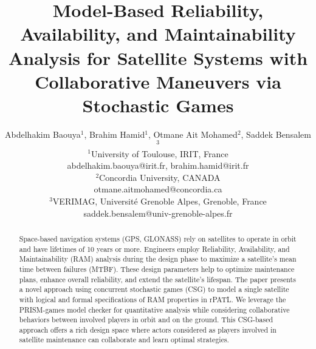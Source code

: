 \documentclass[conference]{IEEEtran}
\begin{document}



\title{Model-Based Reliability, Availability, and Maintainability Analysis for Satellite Systems with Collaborative Maneuvers via Stochastic Games}




\author{Abdelhakim Baouya$^{1}$, Brahim Hamid$^{1}$, Otmane Ait Mohamed$^{2}$, Saddek Bensalem$^{3}$\\
	\normalsize $^{1}$University of Toulouse, IRIT, France\\
	\normalsize abdelhakim.baouya@irit.fr, brahim.hamid@irit.fr\\
 	\normalsize $^{2}$Concordia University, CANADA\\
	\normalsize otmane.aitmohamed@concordia.ca\\
  	\normalsize $^{3}$VERIMAG, Université Grenoble Alpes, Grenoble, France\\
	\normalsize saddek.bensalem@univ-grenoble-alpes.fr\\
}



\maketitle

\begin{abstract}
Space-based navigation systems (GPS, GLONASS) rely on satellites to operate in orbit and have lifetimes of 10 years or more. Engineers employ Reliability, Availability, and Maintainability (RAM) analysis during the design phase to maximize a satellite's mean time between failures (MTBF). These design parameters help to optimize maintenance plans, enhance overall reliability, and extend the satellite's lifespan. The paper presents a novel approach using concurrent stochastic games (CSG) to model a single satellite with logical and formal specifications of RAM properties in rPATL. We leverage the PRISM-games model checker for quantitative analysis while considering collaborative behaviors between involved players in orbit and on the ground. This CSG-based approach offers a rich design space where actors considered as players involved in satellite maintenance can collaborate and learn optimal strategies.

\end{abstract}
\end{document}
